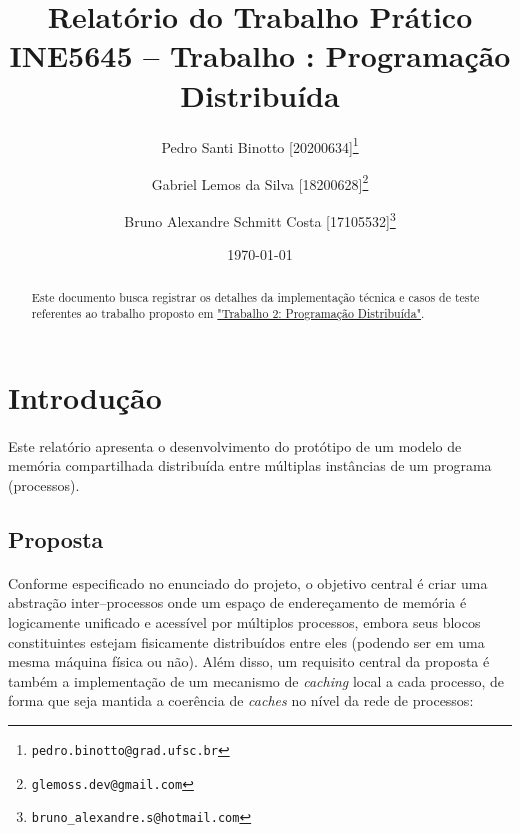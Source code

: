 \documentclass[12pt]{article}
\title{Relatório do Trabalho Prático \\ [0.2em]\smaller{}INE5645 -- Trabalho \RNum{2}: Programação Distribuída}
\author[1]{Pedro Santi Binotto [20200634]\thanks{\texttt{pedro.binotto@grad.ufsc.br}}}
\author[1]{Gabriel Lemos da Silva [18200628]\thanks{\texttt{glemoss.dev@gmail.com}}}
\author[1]{Bruno Alexandre Schmitt Costa [17105532]\thanks{\texttt{bruno\_alexandre.s@hotmail.com}}}
\date{\today}
\affil[1]{Departamento de Informática e Estatística, Universidade Federal de Santa Catarina}
\begin{document}
\begin{titlepage}
\maketitle
\thispagestyle{empty}

\begin{abstract}
  Este documento busca registrar os detalhes da implementação técnica e casos de teste referentes ao trabalho proposto em \href{https://github.com/PedroBinotto/INE5645-2025.01/blob/84814a13247d42dd6bec83c8b5ae65c7805c7bfb/trabalho_2/project/INE5645_trabalho2.pdf}{"Trabalho
  2: Programação Distribuída"}.


\end{abstract}

\end{titlepage}

\tableofcontents

\printglossary[title=Glossário, toctitle=Glossário]

\section{Introdução}

\paragraph{}
Este relatório apresenta o desenvolvimento do protótipo de um modelo de memória compartilhada distribuída entre
múltiplas instâncias de um programa (processos). 

\subsection{Proposta}
\paragraph{}
Conforme especificado no enunciado do projeto, o objetivo central é criar uma abstração inter--processos onde um espaço
de endereçamento de memória é logicamente unificado e acessível por múltiplos processos, embora seus blocos
constituintes estejam fisicamente distribuídos entre eles (podendo ser em uma mesma máquina física ou não). Além disso,
um requisito central da proposta é também a implementação de um mecanismo de \textit{caching} local a cada processo, de
forma que seja mantida a coerência de \textit{caches} no nível da rede de processos:
\end{document}
